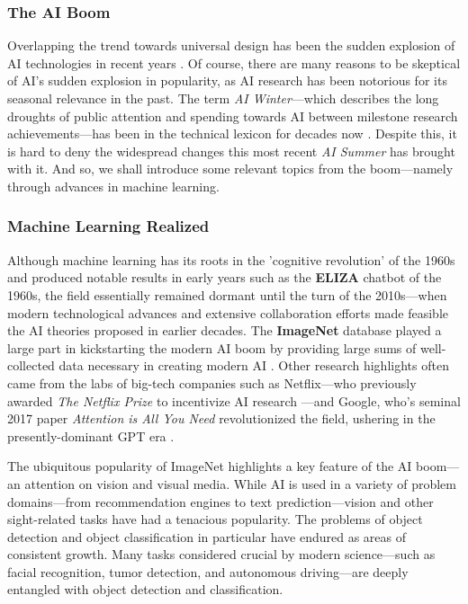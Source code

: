 \documentclass{report}
\newcommand{\tech}[1]{\textbf{#1}}
\begin{document}
\subsubsection{The AI Boom}
Overlapping the trend towards universal design has been the sudden explosion of AI technologies in recent years \cite{Knight_2023}. Of course, there are many reasons to be skeptical of AI's sudden explosion in popularity, as AI research has been notorious for its seasonal relevance in the past. The term \emph{AI Winter}---which describes the long droughts of public attention and spending towards AI between milestone research achievements---has been in the technical lexicon for decades now \cite{AIWinter}. Despite this, it is hard to deny the widespread changes this most recent \emph{AI Summer} has brought with it. And so, we shall introduce some relevant topics from the boom---namely through advances in machine learning. 

\subsubsection{Machine Learning Realized}
Although machine learning has its roots in the 'cognitive revolution' of the 1960s \cite{MILLER2003141} and produced notable results in early years such as the \tech{ELIZA} chatbot of the 1960s, \cite{ELIZA} the field essentially remained dormant until the turn of the 2010s---when modern technological advances and extensive collaboration efforts made feasible the AI theories proposed in earlier decades. The \tech{ImageNet} database played a large part in kickstarting the modern AI boom by providing large sums of well-collected data necessary in creating modern AI \cite{Gershgorn_2017}. Other research highlights often came from the labs of big-tech companies such as Netflix---who previously awarded \emph{The Netflix Prize} to incentivize AI research \cite{netflix}---and Google, who's seminal 2017 paper \emph{Attention is All You Need} \cite{vaswani2023attentionneed} revolutionized the field, ushering in the presently-dominant GPT era \cite{Love_2023}.   

The ubiquitous popularity of ImageNet highlights a key feature of the AI boom---an attention on vision and visual media. While AI is used in a variety of problem domains---from recommendation engines to text prediction---vision and other sight-related tasks have had a tenacious popularity. The problems of object detection and object classification in particular have endured as areas of consistent growth. Many tasks considered crucial by modern science---such as facial recognition, tumor detection, and autonomous driving---are deeply entangled with object detection and classification.
\end{document}

